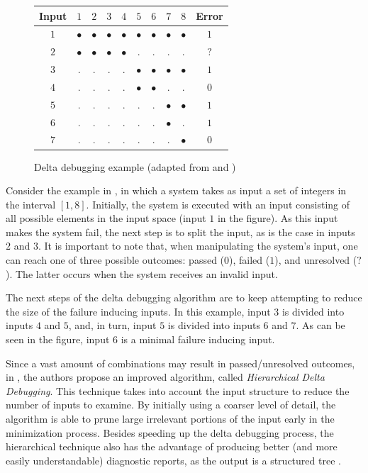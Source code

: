 \begin{figure}[!ht]
  \bgroup
  \def\x{{\Large$\bullet$}}
  \begin{tabular}{c|cccccccc|c}
    Input & $1$ & $2$ & $3$ & $4$ & $5$ & $6$ & $7$ & $8$ & Error \\ \hline
    $1$   & \x  & \x  & \x  & \x  & \x  & \x  & \x  & \x  & $1$   \\
    $2$   & \x  & \x  & \x  & \x  & .   & .   & .   & .   & $?$   \\
    $3$   & .   & .   & .   & .   & \x  & \x  & \x  & \x  & $1$   \\
    $4$   & .   & .   & .   & .   & \x  & \x  & .   & .   & $0$   \\
    $5$   & .   & .   & .   & .   & .   & .   & \x  & \x  & $1$   \\
    $6$   & .   & .   & .   & .   & .   & .   & \x  & .   & $1$   \\
    $7$   & .   & .   & .   & .   & .   & .   & .   & \x  & $0$   \\
  \end{tabular}
  \egroup
  \caption{Delta debugging example (adapted from \citep{Zeller02a} and
    \citep{Perez14a})\label{fig:related-work:dd-example}}
\end{figure}

Consider the example in , in which a
system takes as input a set of integers in the interval $[1,8]$.
%
Initially, the system is executed with an input consisting of all
possible elements in the input space (input $1$ in the figure).
%
As this input makes the system fail, the next step is to split the
input, as is the case in inputs $2$ and $3$.
%
It is important to note that, when manipulating the system's input,
one can reach one of three possible outcomes: passed ($0$), failed
($1$), and unresolved ($?$).
%
The latter occurs when the system receives an invalid input.

The next steps of the delta debugging algorithm are to keep attempting
to reduce the size of the failure inducing inputs.
%
In this example, input $3$ is divided into inputs $4$ and $5$, and, in
turn, input $5$ is divided into inputs $6$ and $7$.
%
As can be seen in the figure, input $6$ is a minimal failure inducing
input.

Since a vast amount of combinations may result in passed/unresolved
outcomes, in \citep{Misherghi06}, the authors propose an improved
algorithm, called \emph{Hierarchical Delta Debugging}.
%
This technique takes into account the input structure to reduce the
number of inputs to examine.
%
By initially using a coarser level of detail, the algorithm is able to
prune large irrelevant portions of the input early in the minimization
process.
%
Besides speeding up the delta debugging process, the hierarchical
technique also has the advantage of producing better (and more easily
understandable) diagnostic reports, as the output is a structured tree
\citep{Perez14a}.
%


